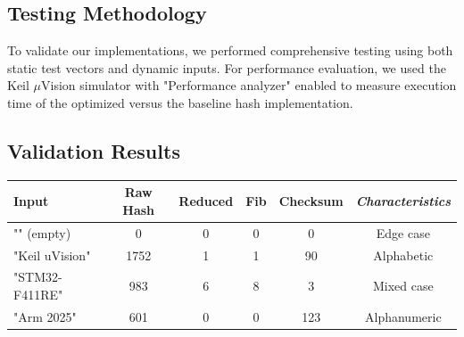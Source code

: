 \documentclass[a4paper,12pt]{article}
\newenvironment{sectionbox}[1]{%
    \tcolorbox[
        colback=titleblue!5,
        colframe=titleblue!50,
        arc=3mm,
        title=#1,
        fonttitle=\bfseries\sffamily,
        before skip=1.2em,
        after skip=1.2em
    ]
}{\endtcolorbox}
\begin{document}
\begin{sectionbox}{Testing \& Validation}
    \subsection*{Testing Methodology}
    To validate our implementations, we performed comprehensive testing using both static test vectors and dynamic inputs. For performance evaluation, we used the Keil $\mu$Vision simulator with "Performance analyzer" enabled to measure execution time of the optimized versus the baseline hash implementation.
    
\subsection*{Validation Results}
\begin{center}
\begin{tabular}{@{}lccccc@{}}
\toprule
\textbf{Input} & \textbf{Raw Hash} & \textbf{Reduced} & \textbf{Fib} & \textbf{Checksum} & \textit{Characteristics} \\
\midrule
"" (empty)        & 0    & 0 & 0  & 0  & Edge case \\
"Keil uVision"     & 1752  & 1 & 1  & 90  & Alphabetic \\
"STM32-F411RE"    & 983 & 6 & 8 & 3  & Mixed case \\
"Arm 2025"       & 601  & 0 & 0  & 123  & Alphanumeric \\

\bottomrule
\end{tabular}
\end{center}
\end{sectionbox}
\end{document}
